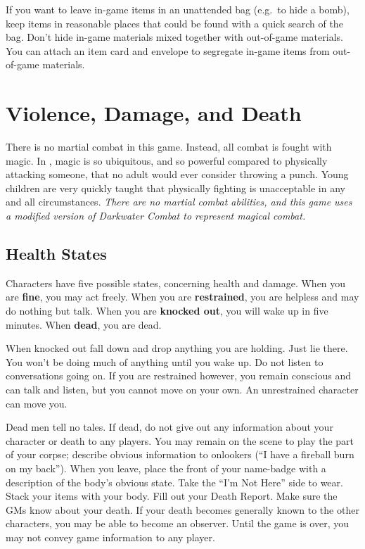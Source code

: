\documentclass[sheet]{GL2020}
\begin{document}
If you want to leave in-game items in an unattended bag (e.g.\ to hide a bomb), keep items in reasonable places that could be found with a quick search of the bag. Don't hide in-game materials mixed together with out-of-game materials. You can attach an item card and envelope to segregate in-game items from out-of-game materials.

\section{Violence, Damage, and Death}
There is no martial combat in this game. Instead, all combat is fought with magic. In \pEarth{}, magic is so ubiquitous, and so powerful compared to physically attacking someone, that no adult would ever consider throwing a punch. Young children are very quickly taught that physically fighting is unacceptable in any and all circumstances. \emph{There are no martial combat abilities, and this game uses a modified version of Darkwater Combat to represent magical combat.}

\subsection{Health States}

Characters have five possible states, concerning health and damage. When you are {\bf fine}, you may act freely. When you are {\bf restrained}, you are helpless and may do nothing but talk.  When you are {\bf knocked out}, you will wake up in five minutes. When {\bf dead}, you are dead.

When knocked out fall down and drop anything you are holding. Just lie there.  You won't be doing much of anything until you wake up. Do not listen to conversations going on. If you are restrained however, you remain conscious and can talk and listen, but you cannot move on your own. An unrestrained character can move you.

Dead men tell no tales. If dead, do not give out any information about your character or death to any players. You may remain on the scene to play the part of your corpse; describe obvious information to onlookers (``I have a fireball burn on my back''). When you leave, place the front of your name-badge with a description of the body's obvious state. Take the ``I'm Not Here'' side to wear. Stack your items with your body. Fill out your Death Report. Make sure the GMs know about your death. If your death becomes generally known to the other characters, you may be able to become an observer. Until the game is over, you may not convey game information to any player.
\end{document}
